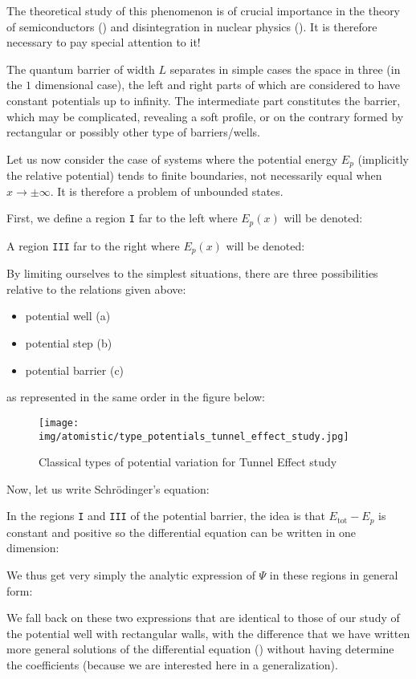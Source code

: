	The theoretical study of this phenomenon is of crucial importance in the theory of semiconductors () and disintegration in nuclear physics (). It is therefore necessary to pay special attention to it!

	The quantum barrier of width $L$ separates in simple cases the space in three (in the $1$ dimensional case), the left and right parts of which are considered to have constant potentials up to infinity. The intermediate part constitutes the barrier, which may be complicated, revealing a soft profile, or on the contrary formed by rectangular or possibly other type of barriers/wells.

	Let us now consider the case of systems where the potential energy $E_p$ (implicitly the relative potential) tends to finite boundaries, not necessarily equal when $x\rightarrow \pm \infty$. It is therefore a problem of unbounded states.

	First, we define a region \texttt{I} far to the left where $E_p(x)$ will be denoted:
	
	A region \texttt{III} far to the right where $E_p(x)$ will be denoted:
	
	By limiting ourselves to the simplest situations, there are three possibilities relative to the relations given above: 
	\begin{itemize}
		\item potential well (a)
		\item potential step (b)
		\item potential barrier (c)
	\end{itemize}
	as represented in the same order in the figure below:
	\begin{figure}[H]
		\centering
		\texttt{[image: img/atomistic/type\_potentials\_tunnel\_effect\_study.jpg]}	
		\caption{Classical types of potential variation for Tunnel Effect study}
	\end{figure}
	Now, let us write Schrödinger's equation:
	
	In the regions \texttt{I} and \texttt{III} of the potential barrier, the idea is that $E_{\text{tot}}-E_p$ is constant and positive so the differential equation can be written in one dimension:
	
	We thus get very simply the analytic expression of $\Psi$ in these regions in general form:
	
	We fall back on these two expressions that are identical to those of our study of the potential well with rectangular walls, with the difference that we have written more general solutions of the differential equation () without having determine the coefficients (because we are interested here in a generalization).

